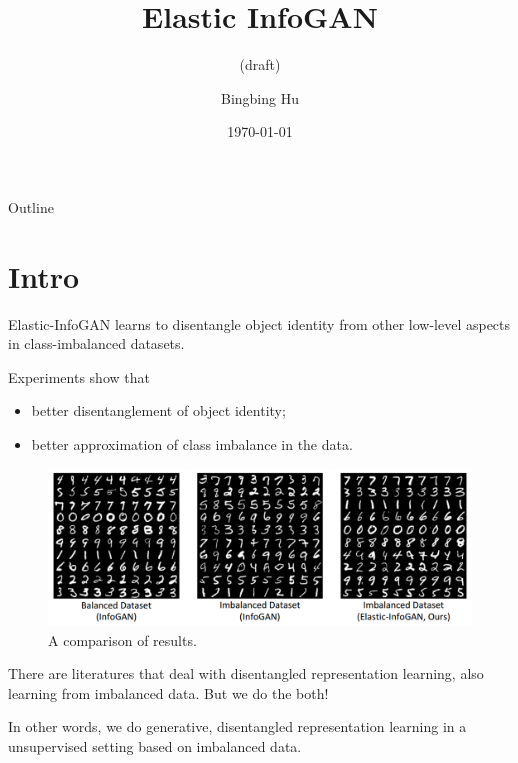 \documentclass[xcolor={svgnames}]{beamer}
\title{Elastic InfoGAN}
\subtitle{(draft)}
\author{Bingbing Hu}
\institute{SIST, ShanghaiTech}
\date{\today}
\begin{document}

\begin{frame}{Outline}
\tableofcontents
\end{frame}

\section{Intro}
 

\begin{frame}
  Elastic-InfoGAN learns to disentangle object identity from other low-level 
  aspects in class-imbalanced datasets.

  Experiments show that
  \begin{itemize}
    \item better disentanglement of object identity;
    \item better approximation of class imbalance in the data.
  \end{itemize}
\end{frame}


\begin{frame}
  \begin{figure}[p]
    \centering
    \includegraphics[width=1.0\textwidth]{figures/triple-compare.png}
    \caption{A comparison of results.}
    \label{fig:1}
  \end{figure}
\end{frame}


\begin{frame}
  There are literatures that deal with disentangled representation learning,
  also learning from imbalanced data. But we do the both!

  In other words, we do \alert{generative}, \alert{disentangled} representation
  learning in a \alert{unsupervised} setting based on \alert{imbalanced} data.
\end{frame}
\end{document}
